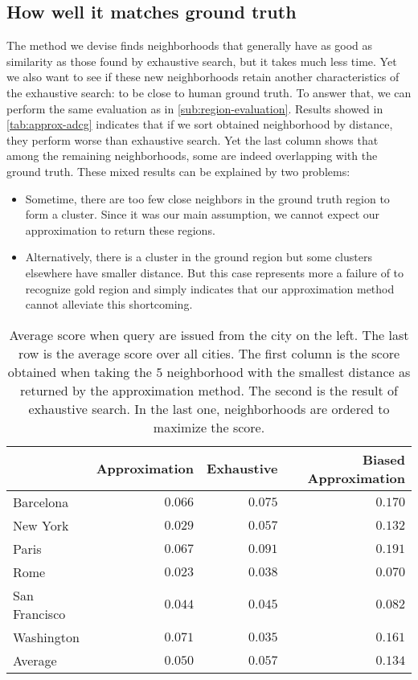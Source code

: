 \subsection{How well it matches ground truth}

The method we devise finds neighborhoods that generally have as good as
similarity as those found by exhaustive search, but it takes much less time.
Yet we also want to see if these new neighborhoods retain another
characteristics of the exhaustive search: to be close to human ground
truth. To answer that, we can perform the same evaluation as in
\autoref{sub:region-evaluation}. Results showed in \autoref{tab:approx-adcg}
indicates that if we sort obtained neighborhood by \emd{} distance, they
perform worse than exhaustive search. Yet the last column shows that among
the remaining neighborhoods, some are indeed overlapping with the ground truth.
These mixed results can be explained by two problems:
\begin{itemize}
	\item Sometime, there are too few close neighbors in the ground truth
		region to form a cluster. Since it was our main assumption, we cannot
		expect our approximation to return these regions.
	\item Alternatively, there is a cluster in the ground region but some
		clusters elsewhere have smaller \emd{} distance. But this case
		represents more a failure of \emd{} to recognize gold region and simply
		indicates that our approximation method cannot alleviate this
		shortcoming.
\end{itemize}

\begin{table}[t]
	\centering
	\begin{tabular}{lrrr}
		\toprule
		              & Approximation & Exhaustive & Biased Approximation \\
		\midrule
		Barcelona     & $0.066$       & $0.075$       & $0.170$ \\
		New York      & $0.029$       & $0.057$       & $0.132$ \\
		Paris         & $0.067$       & $0.091$       & $0.191$ \\
		Rome          & $0.023$       & $0.038$       & $0.070$ \\
		San Francisco & $0.044$       & $0.045$       & $0.082$ \\
		Washington    & $0.071$       & $0.035$       & $0.161$ \\
		\midrule
		Average       & $0.050$       & $0.057$       & $0.134$ \\
		\bottomrule
	\end{tabular}
	\caption[Approximation ability to recover ground truth]{Average score when
		query are issued from the city on the left. The last row is the average
		score over all cities. The first column is the score obtained when
		taking the $5$ neighborhood with the smallest distance as returned by
		the approximation method. The second is the result of exhaustive
		search.  In the last one, neighborhoods are ordered to maximize the
		score. \label{tab:approx-adcg}}
\end{table}
